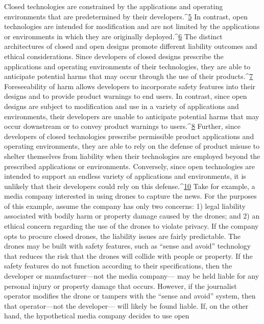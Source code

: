Closed technologies are constrained by the applications and operating environments
that are predetermined by their developers.^{\href{#endnotes-cooper}{5}} In contrast, open
technologies are intended for modification and are not limited by the applications
or environments in which they are originally deployed.^{\href{#endnotes-cooper}{6}}
The distinct architectures of closed and open designs promote different
liability outcomes and ethical considerations. Since developers of closed
designs prescribe the applications and operating environments of their
technologies, they are able to anticipate potential harms that may occur
through the use of their products.^{\href{#endnotes-cooper}{7}} Foreseeability of harm allows developers
to incorporate safety features into their designs and to provide product
warnings to end users. In contrast, since open designs are subject to modification
and use in a variety of applications and environments, their developers
are unable to anticipate potential harms that may occur downstream or
to convey product warnings to users.^{\href{#endnotes-cooper}{8}}
Further, since developers of closed technologies prescribe permissible product
applications and operating environments, they are able to rely on the
defense of product misuse to shelter themselves from liability when their
technologies are employed beyond the prescribed applications or environments.
Conversely, since open technologies are intended to support an
endless variety of applications and environments, it is unlikely that their
developers could rely on this defense.^{\href{#endnotes-cooper}{10}}
Take for example, a media company interested in using drones to capture
the news. For the purposes of this example, assume the company has only two concerns: 1) legal liability associated with bodily harm or property
damage caused by the drones; and 2) an ethical concern regarding the use
of the drones to violate privacy.
If the company opts to procure closed drones, the liability issues are fairly
predictable. The drones may be built with safety features, such as ``sense
and avoid'' technology that reduces the risk that the drones will collide with
people or property. If the safety features do not function according to their
specifications, then the developer or manufacturer—not the media company—
may be held liable for any personal injury or property damage that
occurs. However, if the journalist operator modifies the drone or tampers
with the ``sense and avoid'' system, then that operator—not the developer—
will likely be found liable.
If, on the other hand, the hypothetical media company decides to use open
